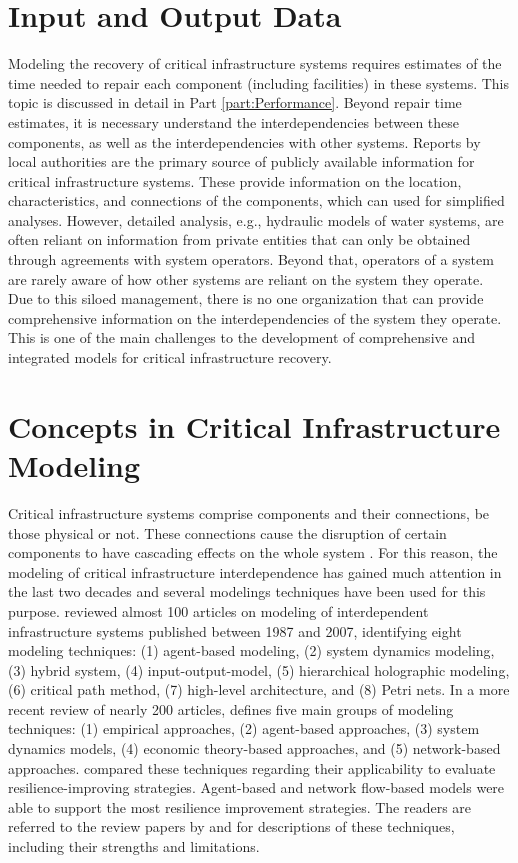 \section{Input and Output Data}
Modeling the recovery of critical infrastructure systems requires estimates of the time needed to repair each component (including facilities) in these systems. This topic is discussed in detail in Part \ref{part:Performance}. Beyond repair time estimates, it is necessary understand the interdependencies between these components, as well as the interdependencies with other systems. Reports by local authorities are the primary source of publicly available information for critical infrastructure systems. These provide information on the location, characteristics, and connections of the components, which can used for simplified analyses. However, detailed analysis, e.g., hydraulic models of water systems, are often reliant on information from private entities that can only be obtained through agreements with system operators. Beyond that, operators of a system are rarely aware of how other systems are reliant on the system they operate. Due to this siloed management, there is no one organization that can provide comprehensive information on the interdependencies of the system they operate. This is one of the main challenges to the development of comprehensive and integrated models for critical infrastructure recovery.\ 

\section{Concepts in Critical Infrastructure Modeling}
Critical infrastructure systems comprise components and their connections, be those physical or not. These connections cause the disruption of certain components to have cascading effects on the whole system \citep{rinaldi2001identifying}. For this reason, the modeling of critical infrastructure interdependence has gained much attention in the last two decades and several modelings techniques have been used for this purpose. \cite{Eusgeld2008a} reviewed almost 100 articles on modeling of interdependent infrastructure systems published between 1987 and 2007, identifying eight modeling techniques: (1) agent-based modeling, (2) system dynamics modeling, (3) hybrid system, (4) input-output-model, (5) hierarchical holographic modeling, (6) critical path method, (7) high-level architecture, and (8) Petri nets. In a more recent review of nearly 200 articles, \cite{ouyang2014review} defines five main groups of modeling techniques: (1) empirical approaches, (2) agent-based approaches, (3) system dynamics models, (4) economic theory-based approaches, and (5) network-based approaches. \cite{ouyang2014review} compared these techniques regarding their applicability to evaluate resilience-improving strategies. Agent-based and network flow-based models were able to support the most resilience improvement strategies. The readers are referred to the review papers by \cite{Eusgeld2008a} and \cite{ouyang2014review} for descriptions of these techniques, including their strengths and limitations. \ 

